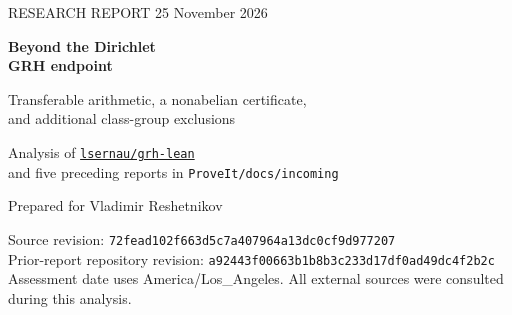 \documentclass[11pt,a4paper]{article}
\newcommand{\C}{\mathbb C}
\newcommand{\file}[1]{\nolinkurl{#1}}
\theoremstyle{definition}
\theoremstyle{remark}
\numberwithin{equation}{section}
\begin{document}
\hypersetup{pageanchor=false}
\begin{titlepage}
{\color{accent}\large RESEARCH REPORT \hfill 25 November 2026\par}
\vspace{20mm}
{\color{ink}\Huge\bfseries Beyond the Dirichlet\\[3pt] GRH endpoint\par}
\vspace{8mm}
{\LARGE Transferable arithmetic, a nonabelian certificate,\\[4pt]
and additional class-group exclusions\par}
\vspace{12mm}
{\large Analysis of \href{https://github.com/lsernau/grh-lean}{\texttt{lsernau/grh-lean}}\\
and five preceding reports in \texttt{ProveIt/docs/incoming}\par}
\vspace{8mm}
Prepared for Vladimir Reshetnikov

\vspace{9mm}
\begin{abstract}
The repository proves RH and GRH for Dirichlet \(L\)-functions. Its internal
arithmetic is more reusable than that endpoint alone suggests. We extract
a uniform torsion-selection theorem and extend it, with a proof, to arbitrary
families of bounded power series over \(\mathcal O_{\C_p}\) with finite total
valuation budget. A single finite torsion grid controls every determinant
simultaneously, independently of degrees and coefficient fields.

For a genuinely nonabelian target, we construct an explicit positive
\(A_5\) character detector. A fully normalized one-sided prime-sum estimate
would imply RH for a specified degree-60 splitting field and three subfields;
the required arithmetic estimate remains unproved. We quantify why fixed
abelian congruence weights cannot supply these coefficients.

Finally, an intermediate genus-field argument answers an unfinished question
in a prior report and gives four additional exclusion families for imaginary
quadratic class groups of exponent six. These are partial classification
results, not a complete census theorem. Full mathematical proofs, exact
finite certificates, pinned source evidence, and explicit limitations
accompany the analysis. No new Lean verification or worldwide novelty claim
is made.
\end{abstract}
\vfill
{\small\color{ink}
Source revision: \file{72fead102f663d5c7a407964a13dc0cf9d977207}\\
Prior-report repository revision: \file{a92443f00663b1b8b3c233d17df0ad49dc4f2b2c}\\
Assessment date uses America/Los\_Angeles. All external sources were consulted
during this analysis.}
\end{titlepage}
\hypersetup{pageanchor=true}
\end{document}
